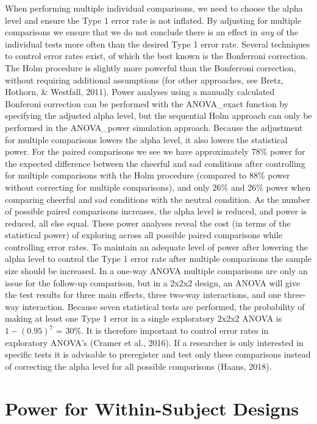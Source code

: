 \documentclass[
  ,jou,floatsintext]{apa6}
\begin{document}
When performing multiple individual comparisons, we need to choose the alpha level and ensure the Type 1 error rate is not inflated.
By adjusting for multiple comparisons we ensure that we do not conclude there is an effect in \emph{any} of the individual tests more often than the desired Type 1 error rate.
Several techniques to control error rates exist, of which the best known is the Bonferroni correction.
The Holm procedure is slightly more powerful than the Bonferroni correction, without requiring additional assumptions (for other approaches, see Bretz, Hothorn, \& Westfall, 2011).
Power analyses using a manually calculated Bonferoni correction can be performed with the ANOVA\_exact function by specifying the adjusted alpha level, but the sequential Holm approach can only be performed in the ANOVA\_power simulation approach.
Because the adjustment for multiple comparisons lowers the alpha level, it also lowers the statistical power.
For the paired comparisons we see we have approximately 78\% power for the expected difference between the cheerful and sad conditions after controlling for multiple comparisons with the Holm procedure (compared to 88\% power without correcting for multiple comparisons), and only 26\% and 26\% power when comparing cheerful and sad conditions with the neutral condition.
As the number of possible paired comparisons increases, the alpha level is reduced, and power is reduced, all else equal.
These power analyses reveal the cost (in terms of the statistical power) of exploring across all possible paired comparisons while controlling error rates.
To maintain an adequate level of power after lowering the alpha level to control the Type 1 error rate after multiple comparisons the sample size should be increased.
In a one-way ANOVA multiple comparisons are only an issue for the follow-up comparison, but in a 2x2x2 design, an ANOVA will give the test results for three main effects, three two-way interactions, and one three-way interaction.
Because seven statistical tests are performed, the probability of making at least one Type 1 error in a single exploratory 2x2x2 ANOVA is \(1-(0.95)^7\) = 30\%.
It is therefore important to control error rates in exploratory ANOVA's (Cramer et al., 2016).
If a researcher is only interested in specific tests it is advisable to preregister and test only these comparisons instead of correcting the alpha level for all possible comparisons (Haans, 2018).

\hypertarget{power-for-within-subject-designs}{%
\section{Power for Within-Subject Designs}\label{power-for-within-subject-designs}}
\end{document}

